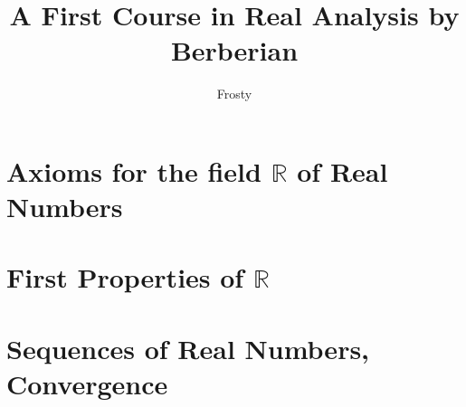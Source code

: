 \documentclass[10pt]{article}  %
\title{A First Course in Real Analysis by Berberian}
\author{Frosty}
\begin{document}
\maketitle

\tableofcontents

\section{Axioms for the field $\mathbb{R}$ of Real Numbers}

\section{First Properties of $\mathbb{R}$}

\section{Sequences of Real Numbers, Convergence}

\end{document}
